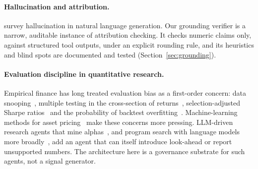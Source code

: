\paragraph{Hallucination and attribution.}
\citet{ji2023hallucination} survey hallucination in natural language
generation. Our grounding verifier is a narrow, auditable instance of
attribution checking. It checks numeric claims only, against structured tool
outputs, under an explicit rounding rule, and its heuristics and blind spots
are documented and tested (Section~\ref{sec:grounding}).

\paragraph{Evaluation discipline in quantitative research.}
Empirical finance has long treated evaluation bias as a first-order concern:
data snooping~\citep{white2000reality,hansen2005spa,romano2005stepwise},
multiple testing in the cross-section of returns~\citep{harvey2016cross},
selection-adjusted Sharpe ratios~\citep{bailey2014deflated} and the
probability of backtest overfitting~\citep{bailey2017pbo}. Machine-learning
methods for asset pricing~\citep{gu2020empirical} make these concerns more
pressing. LLM-driven research agents that mine
alphas~\citep{wang2023alphagpt,yu2023alphagen}, and program search with
language models more broadly~\citep{romeraparedes2024funsearch}, add an agent
that can itself introduce look-ahead or report unsupported numbers. The
architecture here is a governance substrate for such agents, not a signal
generator.
